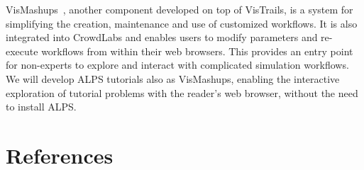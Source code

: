 \documentclass[12pt]{iopart}
\begin{document}
VisMashups~\cite{Santos09}, another component developed on top of VisTrails, is a system for simplifying the creation,
maintenance and use of customized workflows. It is also
integrated into CrowdLabs and enables users to modify parameters and
re-execute workflows from within their web browsers. This provides an
entry point for non-experts to explore and interact with complicated
simulation workflows. We will develop ALPS tutorials also as VisMashups, enabling the interactive exploration of tutorial problems with the reader's web browser, without the need to install ALPS.




\section*{References}



\end{document}
